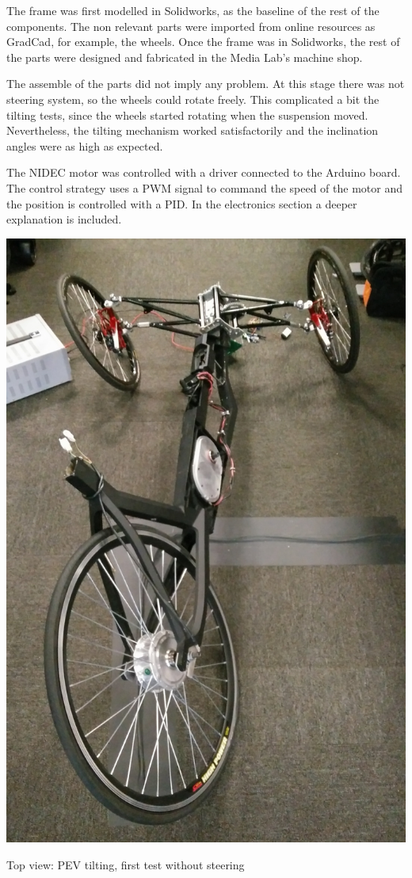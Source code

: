 The frame was first modelled in Solidworks, as the baseline of the rest of the components. The non relevant parts were imported from online resources as GradCad, for example, the wheels. Once the frame was in Solidworks, the rest of the parts were designed and fabricated in the Media Lab's machine shop.

The assemble of the parts did not imply any problem. At this stage there was not steering system, so the wheels could rotate freely. This complicated a bit the tilting tests, since the wheels started rotating when the suspension moved. Nevertheless, the tilting mechanism worked satisfactorily and the inclination angles were as high as expected. 

The NIDEC motor was controlled with a driver connected to the Arduino board. The control strategy uses a PWM signal to command the speed of the motor and the position is controlled with a PID. In the electronics section a deeper explanation is included.

\begin{marginfigure}[-5cm]
	\includegraphics[width=0.95\linewidth]{figs/05/IMG_20161231_124145}
	\caption{Top view: PEV tilting, first test without steering }
\end{marginfigure}
\newpage

